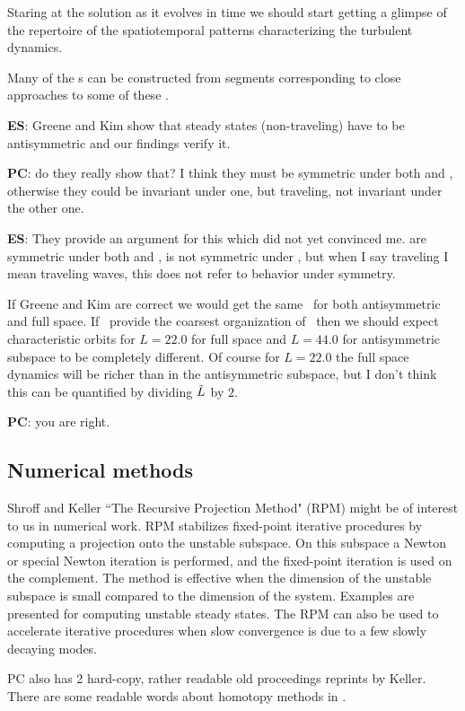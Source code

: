 Staring at the solution
 as it evolves in time we should start getting a glimpse of the
 repertoire of the spatiotemporal patterns characterizing
 the turbulent dynamics.

Many of the \rpo s can be constructed from segments corresponding to
close approaches to some of these \eqva.

\textbf{ES}: Greene and Kim show that steady states (non-traveling)
have to be antisymmetric and our findings verify it.

\textbf{PC}: do they really show that? I think they must be symmetric under both
{\Refl} and \Shift, otherwise they could be invariant under one,
but traveling, not invariant under the other one.

\textbf{ES}: They provide an argument for this which did not yet convinced me.
 are symmetric under both {\Refl} and \Shift,  is not
symmetric under \Shift, but when I say traveling I mean traveling waves,
this does not refer to behavior under symmetry.

If Greene and Kim
are correct we would get the same \eqva\ for both
antisymmetric and full space. If \eqva\ provide the coarsest organization
of \statesp\ then we should expect characteristic orbits for $L=22.0$
for full space and $L=44.0$ for antisymmetric subspace to be completely different.
Of course for $L=22.0$ the full space dynamics will be richer than
in the
antisymmetric subspace, but I don't think this can be quantified by
dividing $\tilde{L}$ by $2$.

\textbf{PC}: you are right.


\subsection{Numerical methods}

Shroff and Keller
``The Recursive Projection Method" (RPM)
might be of interest to us in numerical work.
RPM stabilizes fixed-point iterative
procedures by computing a projection onto the unstable subspace.
On this subspace a Newton or special Newton iteration is performed,
and the fixed-point iteration is used on the complement.
The method is effective when the dimension of the unstable subspace
is small compared to the dimension of the system.
Examples are presented for computing unstable steady states.
The RPM can also be used to accelerate iterative procedures when
slow convergence is due to a few slowly decaying modes.

PC also has 2 hard-copy, rather readable
old proceedings reprints by Keller.
There are some readable words about homotopy methods in
.

